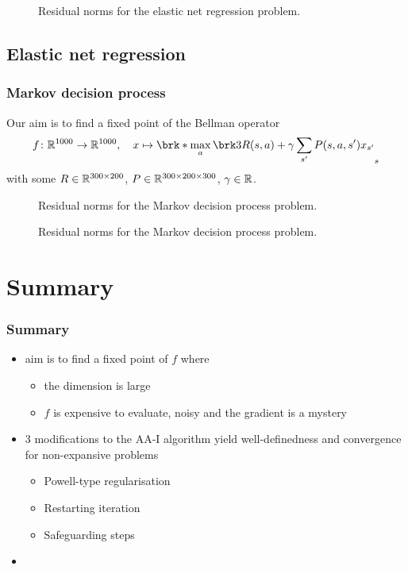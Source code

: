 \begin{frame}
	\begin{figure}
		\centering
		{\scriptsize
		
		}
		\caption{Residual norms for the elastic net regression problem.}
	\end{figure}
\end{frame}
\subsection{Elastic net regression}

\begin{frame}
	\frametitle{Markov decision process}
	Our aim is to find a fixed point of the Bellman operator
	\begin{align*}
		f\colon\R^{1000}\to\R^{1000}, \quad x\mapsto \brk*{\max_{a} \brk3{ R(s,a)+\gamma \sum_{s'}P(s,a,s')x_{s'}}}_{s}
	\end{align*}
	with some $R\in\mathbb{R}^{300\times 200}$, $P\in\mathbb{R}^{300\times 200\times 300}$, $\gamma\in\mathbb{R}$.
\end{frame}


\begin{frame}
	\begin{figure}
		\centering
		{\scriptsize
		
		}
		\caption{Residual norms for the Markov decision process problem.}
	\end{figure}
\end{frame}

\begin{frame}
	\begin{figure}
		\centering
		{\scriptsize
		
		}
		\caption{Residual norms for the Markov decision process problem.}
	\end{figure}
\end{frame}

\section{Summary}

\begin{frame}
	\frametitle{Summary}
	\begin{itemize}
		\item aim is to find a fixed point of $f$ where
		\begin{itemize}
			\item the dimension is large
			\item $f$ is expensive to evaluate, noisy and the gradient is a mystery
		\end{itemize}
		\item 3 modifications to the AA-I algorithm yield well-definedness and convergence for non-expansive problems
		\begin{itemize}
			\item Powell-type regularisation
			\item Restarting iteration
			\item Safeguarding steps
		\end{itemize}
		\item 
	\end{itemize}
\end{frame}

